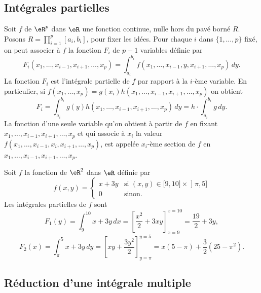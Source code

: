 \subsection{Intégrales partielles}
Soit \( f\) de \( \eR^p\) dans \( \eR\) une fonction continue, nulle hors du pavé borné \( R\). Posons  \( R=\prod_{i=1}^{p}[a_i,b_i]\), pour fixer les idées. Pour chaque \( i\) dans \( \{1,\ldots, p\}\) fixé, on peut associer à \( f\) la fonction \( F_i\) de \( p-1\) variables définie par
\[
	F_i(x_1,\ldots, x_{i-1}, x_{i+1}, \ldots, x_p)=\int_{a_i}^{b_i}f(x_1,\ldots, x_{i-1},y, x_{i+1}, \ldots, x_p)\, dy.
\]
La fonction \( F_i\) est l'intégrale partielle de \( f\) par rapport à la \( i\)-ème variable.
En particulier, si \( f(x_1,\ldots, x_p)=g(x_i)h(x_1,\ldots, x_{i-1}, x_{i+1}, \ldots, x_p)\) on obtient
\[
	F_i=\int_{a_i}^{b_i}g(y)h(x_1,\ldots, x_{i-1}, x_{i+1}, \ldots, x_p)\, dy= h\cdot\int_{a_i}^{b_i}g \, dy.
\]
La fonction d'une seule variable qu'on obtient à partir de \( f\) en fixant \( x_1,\ldots, x_{i-1}, x_{i+1}, \ldots, x_p\) et qui associe à \( x_i\) la valeur \( f(x_1,\ldots, x_{i-1}, x_i, x_{i+1}, \ldots, x_p)\), est appelée \( x_i\)-ème section de \( f\) en \( x_1,\ldots, x_{i-1}, x_{i+1}, \ldots, x_p\).

\begin{example}
	Soit \( f\) la fonction de \( \eR^2\) dans \( \eR\) définie par
	\begin{equation}
		f(x,y)=\begin{cases}
			x+3y & \text{si }(x,y)\in\mathopen[ 9 , 10 \mathclose]\times\mathopen] \pi , 5 \mathclose] \\
			0    & \text{sinon}.
		\end{cases}
	\end{equation}
	Les intégrales partielles de \( f\) sont
	\[
		F_1(y)=\int_{9}^{10}x+3y\,dx=\left[\frac{x^2}{2}+3xy\right]_{x=9}^{x=10}=\frac{19}{2}+3y,
	\]
	\[
		F_2(x)=\int_{\pi}^{5}x+3y\,dy=\left[xy+\frac{3y^2}{2}\right]_{y=\pi}^{y=5}=x(5-\pi)+\frac{3}{2}(25-\pi^2).
	\]
\end{example}
\subsection{Réduction d'une intégrale multiple}

